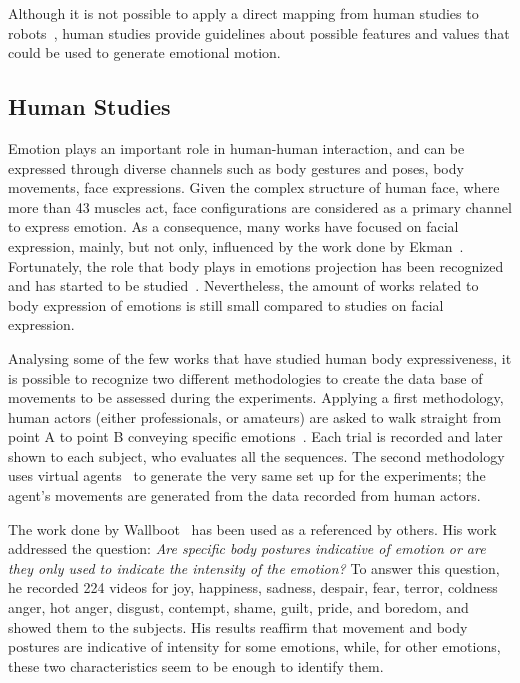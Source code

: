 
Although it is not possible to apply a direct mapping from human studies to robots~\cite{Saerbeck2007,Canamero2010}, human studies provide guidelines about possible features and values that could be used to generate emotional motion. 
 
\subsection{Human Studies}

Emotion plays an important role in human-human interaction, and can be expressed through diverse channels such as body gestures and poses, body movements, face expressions. Given the complex structure of human face, where more than 43 muscles act, face configurations are considered as a primary channel to express emotion. As a consequence, many works have focused on facial expression, mainly, but not only, influenced by the work done by Ekman~\cite{Ekman2004}. Fortunately, the role that body plays in emotions projection has been recognized and has started to be studied~\cite{Gelder2008,Wallboot1998}. Nevertheless, the amount of works related to body expression of emotions is still small compared to studies on facial expression. 

Analysing some of the few works that have studied human body expressiveness, it is possible to recognize two different methodologies to create the data base of movements to be assessed during the experiments. Applying a first methodology, human actors (either professionals, or amateurs) are asked to walk straight from point A to point B conveying specific emotions~\cite{Dael2012,Meijer1989,Wallboot1998}. Each trial is recorded and later shown to each subject, who evaluates all the sequences. The second methodology uses virtual agents~\cite{Roether2009,Venture2014} to generate the very same set up for the experiments; the agent's movements are generated from the data recorded from human actors.

The work done by Wallboot~\cite{Wallboot1998} has been used as a referenced by others.
His work addressed the question: \textit{Are specific body postures indicative of emotion or are they only used to indicate the intensity of the emotion?} To answer this question, he recorded 224 videos for joy, happiness, sadness, despair, fear, terror, coldness anger, hot anger, disgust, contempt, shame, guilt, pride, and boredom, and showed them to the subjects. His results reaffirm that movement and body postures are indicative of intensity for some emotions, while, for other emotions, these two characteristics seem to be enough to identify them.

